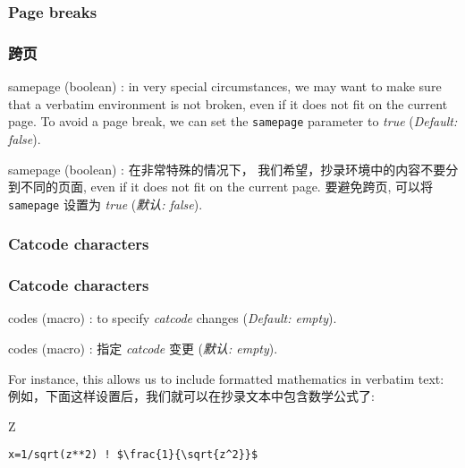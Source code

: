 \documentclass[twoside]{article}
\providecommand\optname[1]{\textsf{#1}}
\newenvironment{optlist}{\begin{description}%
  \renewcommand\makelabel[1]{%
    \descriptionlabel{\mdseries\optname{##1}}}%
  \itemsep0.25\itemsep}%
 {\end{description}}
\newcommand\verbatimTxt{抄录}
\begin{document}
\subsubsection{Page breaks}
\subsubsection{跨页}

\begin{optlist}
  \item[samepage (boolean)]: in very special circumstances, we may want to
  make sure that a verbatim environment is not broken, even if it does not
  fit on the current page. To avoid a page break, we can set the
  \texttt{samepage} parameter to \emph{true} (\emph{Default: false}).
\end{optlist}
\begin{optlist}
  \item[samepage (boolean)]: 在非常特殊的情况下， 
  我们希望，{\verbatimTxt}环境中的内容不要分到不同的页面, even if it does not fit on the current page. 要避免跨页, 可以将
  \texttt{samepage} 设置为 \emph{true} (\emph{默认: false}).
\end{optlist}

\subsubsection{Catcode characters}
\subsubsection{Catcode characters}

\begin{optlist}
  \item[codes (macro)]: to specify \emph{catcode} changes (\emph{Default:
  empty}).
\end{optlist}
\begin{optlist}
  \item[codes (macro)]: 指定 \emph{catcode} 变更 (\emph{默认:
  empty}).
\end{optlist}

  For instance, this allows us to include formatted mathematics in verbatim
text:
例如，下面这样设置后，我们就可以在抄录文本中包含数学公式了:

{
\begin{SideBySideExample}
  Z
  \begin{Verbatim}[commandchars=\\\{\},
         codes={\catcode`$=3\catcode`^=7}]
    x=1/sqrt(z**2) ! $\frac{1}{\sqrt{z^2}}$
  \end{Verbatim}
\end{SideBySideExample}
}  %
\end{document}
